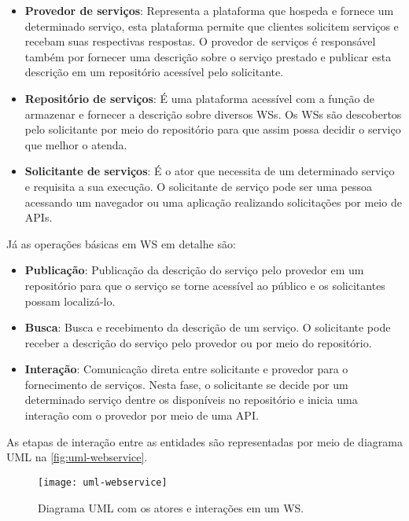 	\begin{itemize}
		\item \textbf{Provedor de serviços}: Representa a plataforma que hospeda e fornece um determinado serviço, esta plataforma permite que clientes solicitem serviços e recebam suas respectivas respostas. O provedor de serviços é responsável também por fornecer uma descrição sobre o serviço prestado e publicar esta descrição em um repositório acessível pelo solicitante.
		
		\item \textbf{Repositório de serviços}: É uma plataforma acessível com a função de armazenar e fornecer a descrição sobre diversos WSs. Os WSs são descobertos pelo solicitante por meio do repositório para que assim possa decidir o serviço que melhor o atenda.
		
		\item \textbf{Solicitante de serviços}: É o ator que necessita de um determinado serviço e requisita a sua execução. O solicitante de serviço pode ser uma pessoa acessando um navegador ou uma aplicação realizando solicitações por meio de APIs.		
	\end{itemize}	
	
	Já as operações básicas em WS em detalhe são:
	
	\begin{itemize}
		\item \textbf{Publicação}: Publicação da descrição do serviço pelo provedor em um repositório para que o serviço se torne acessível ao público e os solicitantes possam localizá-lo.
		
		\item \textbf{Busca}: Busca e recebimento da descrição de um serviço. O solicitante pode receber a descrição do serviço pelo provedor ou por meio do repositório.
		
		\item \textbf{Interação}: Comunicação direta entre solicitante e provedor para o fornecimento de serviços. Nesta fase, o solicitante se decide por um determinado serviço dentre os disponíveis no repositório e inicia uma interação com o provedor por meio de uma API.
	\end{itemize}
	
	As etapas de interação entre as entidades são representadas por meio de diagrama UML na \autoref{fig:uml-webservice}. 
	
	\begin{figure}[htb]
		\centering
		\label{fig:uml-webservice}
		\texttt{[image: uml-webservice]}
		\caption{Diagrama UML com os atores e interações em um WS.}
	\end{figure}

